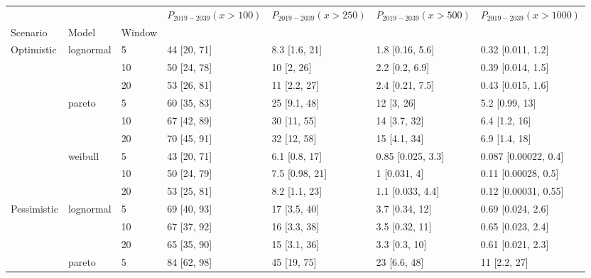 \begin{tabular}{lllllll}
\toprule
           &         &    & $P_{2019-2039}(x>100)$ & $P_{2019-2039}(x>250)$ & $P_{2019-2039}(x>500)$ & $P_{2019-2039}(x>1000)$ \\
Scenario & Model & Window &                        &                        &                        &                         \\
\midrule
Optimistic & lognormal & 5  &            44 [20, 71] &          8.3 [1.6, 21] &        1.8 [0.16, 5.6] &       0.32 [0.011, 1.2] \\
           &         & 10 &            50 [24, 78] &             10 [2, 26] &         2.2 [0.2, 6.9] &       0.39 [0.014, 1.5] \\
           &         & 20 &            53 [26, 81] &           11 [2.2, 27] &        2.4 [0.21, 7.5] &       0.43 [0.015, 1.6] \\
           & pareto & 5  &            60 [35, 83] &           25 [9.1, 48] &             12 [3, 26] &          5.2 [0.99, 13] \\
           &         & 10 &            67 [42, 89] &            30 [11, 55] &           14 [3.7, 32] &           6.4 [1.2, 16] \\
           &         & 20 &            70 [45, 91] &            32 [12, 58] &           15 [4.1, 34] &           6.9 [1.4, 18] \\
           & weibull & 5  &            43 [20, 71] &          6.1 [0.8, 17] &      0.85 [0.025, 3.3] &    0.087 [0.00022, 0.4] \\
           &         & 10 &            50 [24, 79] &         7.5 [0.98, 21] &           1 [0.031, 4] &     0.11 [0.00028, 0.5] \\
           &         & 20 &            53 [25, 81] &          8.2 [1.1, 23] &       1.1 [0.033, 4.4] &    0.12 [0.00031, 0.55] \\
Pessimistic & lognormal & 5  &            69 [40, 93] &           17 [3.5, 40] &         3.7 [0.34, 12] &       0.69 [0.024, 2.6] \\
           &         & 10 &            67 [37, 92] &           16 [3.3, 38] &         3.5 [0.32, 11] &       0.65 [0.023, 2.4] \\
           &         & 20 &            65 [35, 90] &           15 [3.1, 36] &          3.3 [0.3, 10] &       0.61 [0.021, 2.3] \\
           & pareto & 5  &            84 [62, 98] &            45 [19, 75] &           23 [6.6, 48] &            11 [2.2, 27] \\

\end{tabular}

